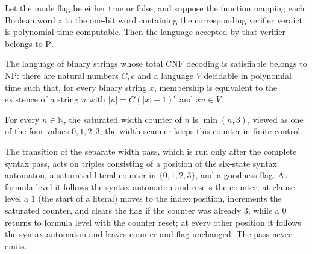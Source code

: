 \begin{lemma}
\label{Complexity.satVerifier_of_poly}
\leanok
{}
Let the mode flag be either true or false, and suppose the function mapping each Boolean
word $z$ to the one-bit word containing the corresponding verifier verdict is
polynomial-time computable. Then the language accepted by that verifier belongs to
$\mathrm{P}$.
\end{lemma}

\begin{theorem}
\label{Complexity.SAT_mem_NP}
\leanok
{}
The language of binary strings whose total CNF decoding is satisfiable belongs to NP:
there are natural numbers $C,c$ and a language $V$ decidable in polynomial time such
that, for every binary string $x$, membership is equivalent to the existence of a string
$u$ with $|u|=C(|x|+1)^c$ and $xu\in V$.
\end{theorem}

\begin{definition}
\label{Complexity.satWidthCap}
\leanok
For every $n \in \mathbb{N}$, the saturated width counter of $n$ is $\min(n, 3)$,
viewed as one of the four values $0, 1, 2, 3$; the width scanner keeps this
counter in finite control.
\end{definition}

\begin{definition}
\label{Complexity.satWidthStep}
\leanok
{}
The transition of the separate width pass, which is run only after the complete
syntax pass, acts on triples consisting of a position of the six-state syntax
automaton, a saturated literal counter in $\{0,1,2,3\}$, and a goodness flag. At
formula level it follows the syntax automaton and resets the counter; at clause
level a $1$ (the start of a literal) moves to the index position, increments the
saturated counter, and clears the flag if the counter was already $3$, while a
$0$ returns to formula level with the counter reset; at every other position it
follows the syntax automaton and leaves counter and flag unchanged. The pass never
emits.
\end{definition}

